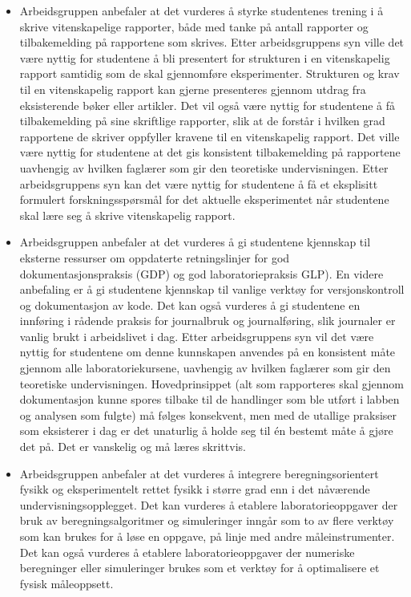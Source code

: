 \documentclass{article}
\begin{document}
\begin{itemize}
  \item Arbeidsgruppen anbefaler at det vurderes å styrke studentenes trening i å skrive vitenskapelige rapporter, både med tanke på antall rapporter og tilbakemelding på rapportene som skrives. Etter arbeidsgruppens syn ville det være nyttig for studentene å bli presentert for strukturen i en vitenskapelig rapport samtidig som de skal gjennomføre eksperimenter. Strukturen og krav til en vitenskapelig rapport kan gjerne presenteres gjennom utdrag fra eksisterende bøker eller artikler. Det vil også være nyttig for studentene å få tilbakemelding på sine skriftlige rapporter, slik at de forstår i hvilken grad rapportene de skriver oppfyller kravene til en vitenskapelig rapport. Det ville være nyttig for studentene at det gis konsistent tilbakemelding på rapportene uavhengig av hvilken faglærer som gir den teoretiske undervisningen. Etter arbeidsgruppens syn kan det være nyttig for studentene å få et eksplisitt formulert forskningsspørsmål for det aktuelle eksperimentet når studentene skal lære seg å skrive vitenskapelig rapport.

  \item Arbeidsgruppen anbefaler at det vurderes å gi studentene kjennskap til eksterne ressurser om oppdaterte retningslinjer for god dokumentasjonspraksis (GDP) og god laboratoriepraksis GLP). En videre anbefaling er å gi studentene kjennskap til vanlige verktøy for versjonskontroll og dokumentasjon av kode. Det kan også vurderes å gi studentene en innføring i rådende praksis for journalbruk og journalføring, slik journaler er vanlig brukt i arbeidslivet i dag. Etter arbeidsgruppens syn vil det være nyttig for studentene om denne kunnskapen anvendes på en konsistent måte gjennom alle laboratoriekursene, uavhengig av hvilken faglærer som gir den teoretiske undervisningen. {\color{red} Hovedprinsippet (alt som rapporteres skal gjennom dokumentasjon kunne spores tilbake til de handlinger som ble utført i labben og analysen som fulgte) må følges konsekvent, men med de utallige praksiser som eksisterer i dag er det unaturlig å holde seg til én bestemt måte å gjøre det på. Det er vanskelig og må læres skrittvis.}

  \item Arbeidsgruppen anbefaler at det vurderes å integrere beregningsorientert fysikk og eksperimentelt rettet fysikk i større grad enn i det nåværende undervisningsopplegget. Det kan vurderes å etablere laboratorieoppgaver der bruk av beregningsalgoritmer og simuleringer inngår som to av flere verktøy som kan brukes for å løse en oppgave, på linje med andre måleinstrumenter. Det kan også vurderes å etablere laboratorieoppgaver der numeriske beregninger eller simuleringer brukes som et verktøy for å optimalisere et fysisk måleoppsett.


\end{itemize}
\end{document}
